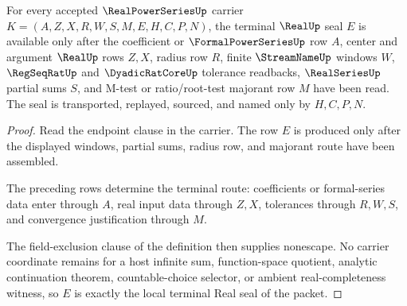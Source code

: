 \begin{theorem}
\label{thm:realpowerseries-terminal-real-seal-obligation}
For every accepted $\RealPowerSeriesUp$ carrier $K=(A,Z,X,R,W,S,M,E,H,C,P,N)$, the terminal $\RealUp$ seal $E$ is available only after the coefficient or $\FormalPowerSeriesUp$ row $A$, center and argument $\RealUp$ rows $Z,X$, radius row $R$, finite $\StreamNameUp$ windows $W$, $\RegSeqRatUp$ and $\DyadicRatCoreUp$ tolerance readbacks, $\RealSeriesUp$ partial sums $S$, and M-test or ratio/root-test majorant row $M$ have been read. The seal is transported, replayed, sourced, and named only by $H,C,P,N$.
\end{theorem}
\begin{proof}
Read the endpoint clause in the carrier. The row $E$ is produced only after the displayed windows, partial sums, radius row, and majorant route have been assembled.

The preceding rows determine the terminal route: coefficients or formal-series data enter through $A$, real input data through $Z,X$, tolerances through $R,W,S$, and convergence justification through $M$.

The field-exclusion clause of the definition then supplies nonescape. No carrier coordinate remains for a host infinite sum, function-space quotient, analytic continuation theorem, countable-choice selector, or ambient real-completeness witness, so $E$ is exactly the local terminal Real seal of the packet.
\end{proof}

